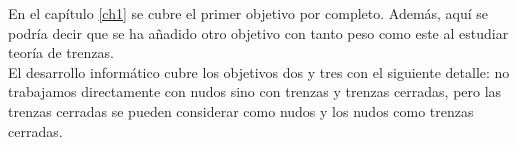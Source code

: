 En el capítulo \ref{ch1} se cubre el primer objetivo por completo. Además, aquí se podría decir que se ha añadido otro objetivo con tanto peso como este al estudiar teoría de trenzas. \\

El desarrollo informático cubre los objetivos dos y tres con el siguiente detalle: no trabajamos directamente con nudos sino con trenzas y trenzas cerradas, pero las trenzas cerradas se pueden considerar como nudos y los nudos como trenzas cerradas. 